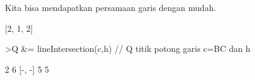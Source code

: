 \documentclass[a4paper,10pt]{article}
\begin{document}
\begin{eulernotebook}
\begin{eulercomment}
\begin{eulercomment}
\begin{euleroutput}
                               [- 1, 2, 2]
  
\end{euleroutput}
\begin{eulercomment}
Kita bisa mendapatkan persamaan garis dengan mudah.
\end{eulercomment}
\begin{euleroutput}
  
                                [2, 1, 2]
  
\end{euleroutput}
\begin{eulerprompt}
>Q &= lineIntersection(c,h) // Q titik potong garis c=BC dan h
\end{eulerprompt}
\begin{euleroutput}
  
                                   2  6
                                  [-, -]
                                   5  5
  

\end{euleroutput}
\end{eulercomment}
\end{eulercomment}
\end{eulernotebook}
\end{document}
